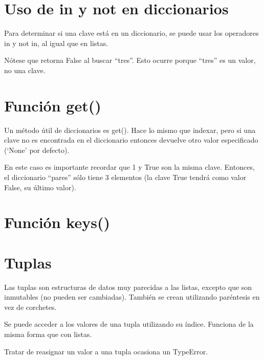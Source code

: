\documentclass{report}
\newcommand{\simple}[1]{`#1'}
\newcommand{\doble}[1]{``#1''}
\begin{document}

\section{Uso de in y not en diccionarios}

Para determinar si una clave está en un diccionario, se puede usar los operadores in y not in, al igual que en listas.


Nótese que retorna False al buscar \doble{tres}. Esto ocurre porque \doble{tres} es un valor, no una clave.


\section{Función get()}

Un método útil de diccionarios es get(). Hace lo mismo que indexar, pero si una clave no es encontrada en el diccionario entonces devuelve otro valor especificado (\simple{None} por defecto).


En este caso es importante recordar que 1 y True son la misma clave. Entonces, el diccionario \doble{pares} sólo tiene 3 elementos (la clave True tendrá como valor False, su último valor).


\section{Función keys()}

\section{Tuplas}

Las tuplas son estructuras de datos muy parecidas a las listas, excepto que son inmutables (no pueden ser cambiadas). También se crean utilizando paréntesis en vez de corchetes.



Se puede acceder a los valores de una tupla utilizando su índice. Funciona de la misma forma que con listas.


Tratar de reasignar un valor a una tupla ocasiona un TypeError.
\end{document}
